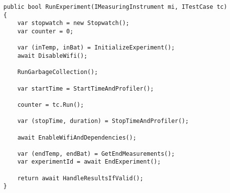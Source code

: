 

\begin{lstlisting}[caption=The method running the test case, label={lst:run_experiments}]
public bool RunExperiment(IMeasuringInstrument mi, ITestCase tc)
{
    var stopwatch = new Stopwatch();
    var counter = 0;

    var (inTemp, inBat) = InitializeExperiment();
    await DisableWifi();

    RunGarbageCollection();

    var startTime = StartTimeAndProfiler();

    counter = tc.Run();

    var (stopTime, duration) = StopTimeAndProfiler();

    await EnableWifiAndDependencies();

    var (endTemp, endBat) = GetEndMeasurements();
    var experimentId = await EndExperiment();

    return await HandleResultsIfValid();
}
    \end{lstlisting}
